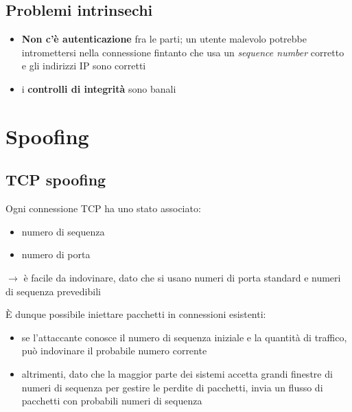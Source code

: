 \subsection{Problemi intrinsechi}
\begin{itemize}
    \item \textbf{Non c'è autenticazione} fra le parti; un utente malevolo potrebbe 
    intromettersi nella connessione fintanto che usa un \textit{sequence number} corretto 
    e gli indirizzi IP sono corretti 
    \item i \textbf{controlli di integrità} sono banali
\end{itemize}

\section{Spoofing}

\subsection{TCP spoofing}
Ogni connessione TCP ha uno stato associato:
\begin{itemize}
    \item numero di sequenza 
    \item numero di porta 
\end{itemize}

$\rightarrow$ è facile da indovinare, dato che si usano numeri di porta standard e numeri 
di sequenza prevedibili

\noindent È dunque possibile iniettare pacchetti in connessioni esistenti:
\begin{itemize}
    \item se l'attaccante conosce il numero di sequenza iniziale e la quantità di traffico, può indovinare 
    il probabile numero corrente 
    \item altrimenti, dato che la maggior parte dei sistemi accetta grandi finestre di numeri di sequenza per gestire 
    le perdite di pacchetti, invia un flusso di pacchetti con probabili numeri di sequenza
\end{itemize}

